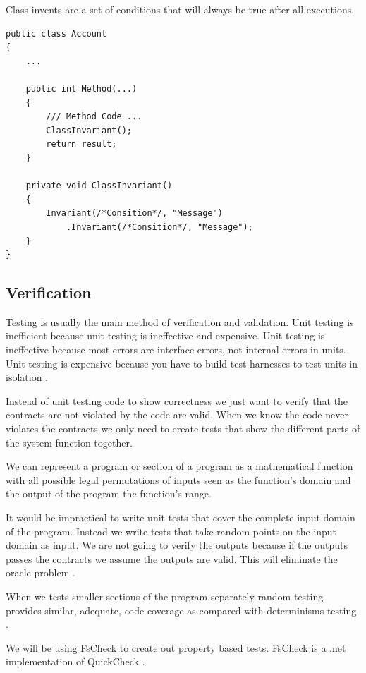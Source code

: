 Class invents are a set of conditions that will always be true after all 
executions.

\begin{lstlisting}[frame=single]
public class Account
{
    ...

    public int Method(...)
    {
        /// Method Code ...
        ClassInvariant();
        return result;
    }
    
    private void ClassInvariant()
    {
        Invariant(/*Consition*/, "Message")
            .Invariant(/*Consition*/, "Message");
    }
}
\end{lstlisting}

\subsection{Verification}
Testing is usually the main method of verification and validation.  Unit testing
is inefficient because unit testing is ineffective and expensive. 
Unit testing is ineffective because most errors are interface errors, not internal
errors in units. Unit testing is expensive because you have to build test 
harnesses to test units in isolation \parencite{CbyCPraxis}.

Instead of unit testing code to show correctness we just want to verify 
that the contracts are not violated by the code are valid. When we know the 
code never violates the contracts we only need to create tests that show 
the different parts of the system function together.

We can represent a program or section of a program as a mathematical function
with all possible legal permutations of inputs seen as the function's domain and 
the output of the program the function's range.

It would be impractical to write unit tests that cover the complete input domain
of the program. Instead we write tests that take random points on the input domain
as input. We are not going to verify the outputs because if the outputs passes the 
contracts we assume the outputs are valid. This will eliminate the oracle problem 
\parencite{QuickCheck}.

When we tests smaller sections of the program separately random testing 
provides similar, adequate, code coverage as compared with determinisms testing
\parencite{QuickCheck}\parencite{Hamlet94randomtesting}.

We will be using FsCheck to create out property based tests. FsCheck is a .net 
implementation of QuickCheck \parencite{FsCheck_home}. 
